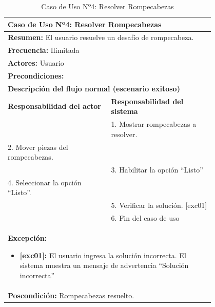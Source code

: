 \begin{table}[H]
    \centering
    \caption{Caso de Uso Nº4: Resolver Rompecabezas}
    
    \begin{tabular}{| p{0.4\linewidth} | p{0.4\linewidth} |}
        \hline
        \multicolumn{2}{|l|}{\textbf{Caso de Uso Nº4:} Resolver Rompecabezas} \\
        \hline
        \multicolumn{2}{|l|}{\textbf{Resumen:} El usuario resuelve un desafío de rompecabeza.} \\
        \hline
        \multicolumn{2}{|l|}{\textbf{Frecuencia:} Ilimitada} \\
        \hline
        \multicolumn{2}{|l|}{\textbf{Actores:} Usuario} \\
        \hline
        \multicolumn{2}{|l|}{\textbf{Precondiciones:}} \\
        \hline
        \multicolumn{2}{|l|}{\textbf{Descripción del flujo normal (escenario exitoso)} } \\
        \hline
        \textbf{Responsabilidad del actor} & \textbf{Responsabilidad del sistema} \\
        & 1. Mostrar rompecabezas a resolver. \\
        2. Mover piezas del rompecabezas. \\
        & 3. Habilitar la opción “Listo” \\
        4. Seleccionar la opción “Listo”. \\
        & 5. Verificar la solución. [exc01] \\
        & 6. Fin del caso de uso \\
        \hline
        \multicolumn{2}{|p{0.8\linewidth}|}{
            \textbf{Excepción:}
            \begin{itemize}
                \item \textbf{[exc01]:} El usuario ingresa la solución incorrecta. El sistema muestra un mensaje de advertencia ``Solución incorrecta”
            \end{itemize}}\\
        \hline
        \multicolumn{2}{|l|}{\textbf{Poscondición:} Rompecabezas resuelto.} \\
        \hline
    \end{tabular}

    \label{table:4}
\end{table}

